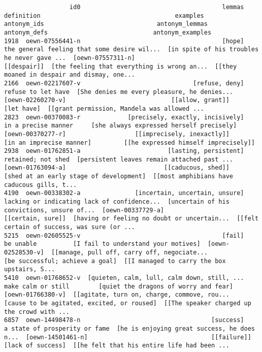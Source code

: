 \documentclass[a4paper,10pt,onecolumn,oneside,openright]{article}
\begin{document}
\begin{verbatim}
                  id0                                       lemmas                                   definition                                     examples        antonym_ids                               antonym_lemmas                                 antonym_defs                             antonym_examples
1918  oewn-07556441-n                                       [hope]  the general feeling that some desire wil...  [in spite of his troubles he never gave ...  [oewn-07557311-n]                                  [[despair]]  [the feeling that everything is wrong an...  [[they moaned in despair and dismay, one...
2166  oewn-02217607-v                               [refuse, deny]                           refuse to let have  [She denies me every pleasure, he denies...  [oewn-02260270-v]                             [[allow, grant]]                                   [let have]  [[grant permission, Mandela was allowed ...
2823  oewn-00370083-r             [precisely, exactly, incisively]                          in a precise manner     [she always expressed herself precisely]  [oewn-00370277-r]                   [[imprecisely, inexactly]]                     [in an imprecise manner]         [[he expressed himself imprecisely]]
2938  oewn-01762851-a                        [lasting, persistent]                           retained; not shed  [persistent leaves remain attached past ...  [oewn-01763094-a]                           [[caducous, shed]]      [shed at an early stage of development]  [[most amphibians have caducous gills, t...
4190  oewn-00338302-a               [incertain, uncertain, unsure]  lacking or indicating lack of confidence...  [uncertain of his convictions, unsure of...  [oewn-00337729-a]                            [[certain, sure]]  [having or feeling no doubt or uncertain...  [[felt certain of success, was sure (or ...
5215  oewn-02605525-v                                       [fail]                                    be unable          [I fail to understand your motives]  [oewn-02528530-v]  [[manage, pull off, carry off, negociate...              [be successful; achieve a goal]  [[I managed to carry the box upstairs, S...
5410  oewn-01768652-v  [quieten, calm, lull, calm down, still, ...                           make calm or still        [quiet the dragons of worry and fear]  [oewn-01766380-v]  [[agitate, turn on, charge, commove, rou...   [cause to be agitated, excited, or roused]  [[The speaker charged up the crowd with ...
6857  oewn-14498478-n                                    [success]                a state of prosperity or fame  [he is enjoying great success, he does n...  [oewn-14501461-n]                                  [[failure]]                            [lack of success]  [[he felt that his entire life had been ...
\end{verbatim}
\end{document}
